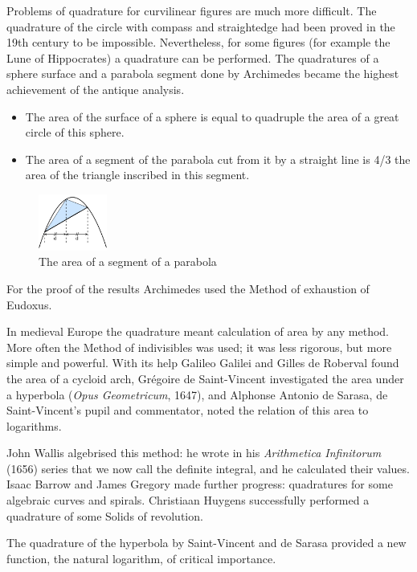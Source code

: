 \documentclass[a4paper]{article}
\begin{document}
Problems of quadrature for curvilinear figures are much more difficult. The quadrature of the circle with compass and straightedge had been proved in the 19th century to be impossible. Nevertheless, for some figures (for example the Lune of Hippocrates) a quadrature can be performed. The quadratures of a sphere surface and a parabola segment done by Archimedes became the highest achievement of the antique analysis.

\begin{itemize}
\item The area of the surface of a sphere is equal to quadruple the area of a great circle of this sphere.
\item The area of a segment of the parabola cut from it by a straight line is 4/3 the area of the triangle inscribed in this segment.
\end{itemize}

\begin{figure}
	\begin{center}
		\includegraphics[width=0.2\textwidth]{3}
	\end{center}
	\caption{The area of a segment of a parabola}
\end{figure}
For the proof of the results Archimedes used the Method of exhaustion of Eudoxus.

In medieval Europe the quadrature meant calculation of area by any method. More often the Method of indivisibles was used; it was less rigorous, but more simple and powerful. With its help Galileo Galilei and Gilles de Roberval found the area of a cycloid arch, Gr\'egoire de Saint-Vincent investigated the area under a hyperbola (\textit{Opus Geometricum}, 1647), and Alphonse Antonio de Sarasa, de Saint-Vincent's pupil and commentator, noted the relation of this area to logarithms.

John Wallis algebrised this method: he wrote in his \textit{Arithmetica Infinitorum} (1656) series that we now call the definite integral, and he calculated their values. Isaac Barrow and James Gregory made further progress: quadratures for some algebraic curves and spirals. Christiaan Huygens successfully performed a quadrature of some Solids of revolution.

The quadrature of the hyperbola by Saint-Vincent and de Sarasa provided a new function, the natural logarithm, of critical importance.
\end{document}

